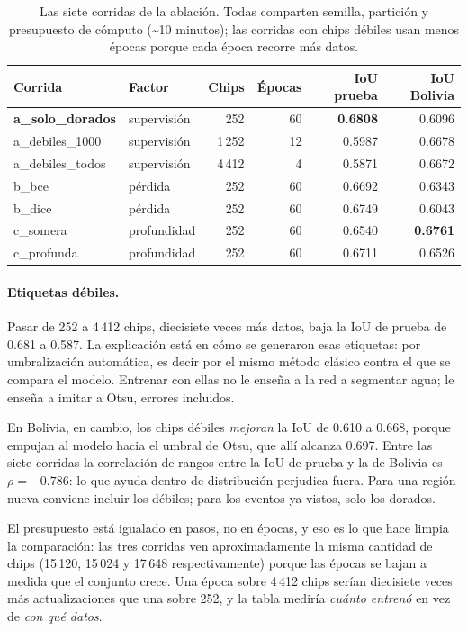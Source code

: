 \documentclass{article}
\begin{document}
\begin{table}[!htbp]
\centering
\caption{Las siete corridas de la ablación. Todas comparten semilla, partición y
presupuesto de cómputo (\textasciitilde10 minutos); las corridas con chips
débiles usan menos épocas porque cada época recorre más datos.}
\label{tab:ablacion}
\small
\begin{tabular}{llrrrr}
\toprule
Corrida & Factor & Chips & Épocas & IoU prueba & IoU Bolivia \\
\midrule
\textbf{a\_solo\_dorados} & supervisión & 252 & 60 & \textbf{0.6808} & 0.6096 \\
a\_debiles\_1000 & supervisión & 1\,252 & 12 & 0.5987 & 0.6678 \\
a\_debiles\_todos & supervisión & 4\,412 & 4 & 0.5871 & 0.6672 \\
\midrule
b\_bce & pérdida & 252 & 60 & 0.6692 & 0.6343 \\
b\_dice & pérdida & 252 & 60 & 0.6749 & 0.6043 \\
\midrule
c\_somera & profundidad & 252 & 60 & 0.6540 & \textbf{0.6761} \\
c\_profunda & profundidad & 252 & 60 & 0.6711 & 0.6526 \\
\bottomrule
\end{tabular}
\end{table}

\paragraph{Etiquetas débiles.}
Pasar de 252 a 4\,412 chips, diecisiete veces más datos, baja la IoU de
prueba de 0.681 a 0.587. La
explicación está en cómo se generaron esas etiquetas: por umbralización
automática, es decir por el mismo método clásico contra el que se compara
el modelo. Entrenar con ellas no le enseña a la red a segmentar agua; le enseña
a imitar a Otsu, errores incluidos.

En Bolivia, en cambio, los chips débiles \emph{mejoran} la IoU de 0.610 a
0.668, porque empujan al modelo hacia el umbral de Otsu, que allí alcanza 0.697.
Entre las siete corridas la correlación de rangos entre la IoU de prueba y la de
Bolivia es $\rho=-0.786$: lo que ayuda dentro de distribución perjudica fuera.
Para una región nueva conviene incluir los débiles; para los eventos ya vistos,
solo los dorados.

El presupuesto está igualado en pasos, no en épocas, y eso es lo que
hace limpia la comparación: las tres corridas ven aproximadamente la misma
cantidad de chips (15\,120, 15\,024 y 17\,648 respectivamente) porque las
épocas se bajan a medida que el conjunto crece. Una época sobre 4\,412 chips
serían diecisiete veces más actualizaciones que una sobre 252, y la tabla
mediría \emph{cuánto entrenó} en vez de \emph{con qué datos}.
\end{document}
